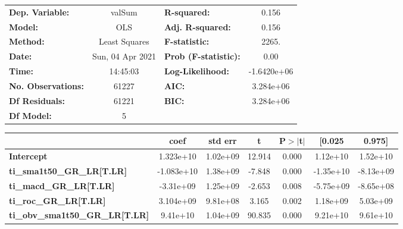 \begin{center}
\begin{tabular}{lclc}
\toprule
\textbf{Dep. Variable:}                 &      valSum      & \textbf{  R-squared:         } &      0.156   \\
\textbf{Model:}                         &       OLS        & \textbf{  Adj. R-squared:    } &      0.156   \\
\textbf{Method:}                        &  Least Squares   & \textbf{  F-statistic:       } &      2265.   \\
\textbf{Date:}                          & Sun, 04 Apr 2021 & \textbf{  Prob (F-statistic):} &      0.00    \\
\textbf{Time:}                          &     14:45:03     & \textbf{  Log-Likelihood:    } & -1.6420e+06  \\
\textbf{No. Observations:}              &       61227      & \textbf{  AIC:               } &  3.284e+06   \\
\textbf{Df Residuals:}                  &       61221      & \textbf{  BIC:               } &  3.284e+06   \\
\textbf{Df Model:}                      &           5      & \textbf{                     } &              \\
\bottomrule
\end{tabular}
\begin{tabular}{lcccccc}
                                        & \textbf{coef} & \textbf{std err} & \textbf{t} & \textbf{P$> |$t$|$} & \textbf{[0.025} & \textbf{0.975]}  \\
\midrule
\textbf{Intercept}                      &    1.323e+10  &     1.02e+09     &    12.914  &         0.000        &     1.12e+10    &     1.52e+10     \\
\textbf{ti\_sma1t50\_GR\_LR[T.LR]}      &   -1.083e+10  &     1.38e+09     &    -7.848  &         0.000        &    -1.35e+10    &    -8.13e+09     \\
\textbf{ti\_macd\_GR\_LR[T.LR]}         &    -3.31e+09  &     1.25e+09     &    -2.653  &         0.008        &    -5.75e+09    &    -8.65e+08     \\
\textbf{ti\_roc\_GR\_LR[T.LR]}          &    3.104e+09  &     9.81e+08     &     3.165  &         0.002        &     1.18e+09    &     5.03e+09     \\
\textbf{ti\_obv\_sma1t50\_GR\_LR[T.LR]} &     9.41e+10  &     1.04e+09     &    90.835  &         0.000        &     9.21e+10    &     9.61e+10     \\

\end{tabular}
\end{center}
